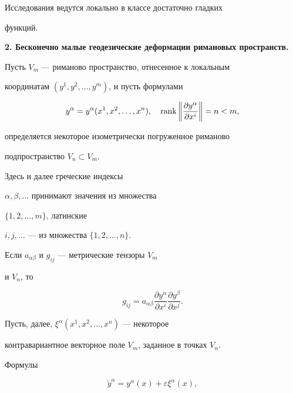 Исследования ведутся локально в классе достаточно гладких


функций. 


\medskip





{\bf 2. Бесконечно малые геодезические деформации римановых пространств.}


Пусть $V_m$ --- риманово пространство, отнесенное к локальным


координатам $(y^1,y^2,\dotsc ,y^m)$, и пусть формулами


\begin{equation}


y^\alpha =y^\alpha (x^1,x^2,\dotsc ,x^n),\quad \rank\bigg\|


\frac{\partial y^\alpha }{\partial x^i}\bigg\| =n<m,


\end{equation}


определяется некоторое изометрически погруженное риманово


подпространство $V_n\subset V_m$. 


Здесь и далее греческие индексы 


$\alpha,\beta,\dotsc$ принимают значения из множества


$\{1,2,\dotsc ,m\}$, латинские 


$i,j,\dotsc$ --- из множества $\{1,2,\dotsc,n\}$.





Если $a_{\alpha \beta }$ и $g_{ij}$ --- метрические тензоры $V_m$


и $V_n$, то \cite{ei}


\begin{equation}


g_{ij}=a_{\alpha \beta }\frac{\partial y^\alpha }{\partial x^i}


\frac{\partial y^\beta }{\partial x^j}.


\end{equation}





Пусть, далее, $\xi^\alpha (x^1,x^2,\dotsc ,x^n)$ --- некоторое


контравариантное векторное поле $V_m$, заданное в точках $V_n$.


Формулы


\begin{equation}


\widetilde{y}^\alpha =y^\alpha (x)+\varepsilon \xi^\alpha (x),


\end{equation}


